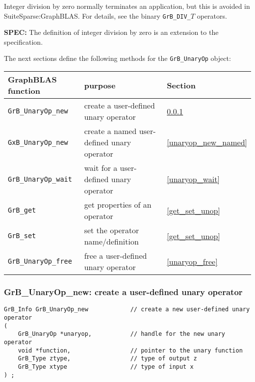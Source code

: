\documentclass[12pt]{article}
\begin{document}
Integer division by zero normally terminates an application, but this is
avoided in SuiteSparse:GraphBLAS.  For details, see the binary
\verb'GrB_DIV_'$T$ operators.

\begin{alert}
{\bf SPEC:} The definition of integer division by zero is an extension to the
specification.
\end{alert}

The next sections define the following methods for the \verb'GrB_UnaryOp'
object:

\vspace{0.1in}
{\footnotesize
\noindent
\begin{tabular}{lll}
\hline
GraphBLAS function   & purpose                                      & Section \\
\hline
\verb'GrB_UnaryOp_new'   & create a user-defined unary operator         & \ref{unaryop_new} \\
\verb'GxB_UnaryOp_new'   & create a named user-defined unary operator   & \ref{unaryop_new_named} \\
\verb'GrB_UnaryOp_wait'  & wait for a user-defined unary operator       & \ref{unaryop_wait} \\
\verb'GrB_get'           & get properties of an operator    & \ref{get_set_unop} \\
\verb'GrB_set'           & set the operator name/definition & \ref{get_set_unop} \\
\verb'GrB_UnaryOp_free'  & free a user-defined unary operator   & \ref{unaryop_free} \\
\hline
\end{tabular}
}
\vspace{0.1in}

\subsubsection{{\sf GrB\_UnaryOp\_new:} create a user-defined unary operator}
\label{unaryop_new}

\begin{mdframed}[userdefinedwidth=6in]
{\footnotesize
\begin{verbatim}
GrB_Info GrB_UnaryOp_new            // create a new user-defined unary operator
(
    GrB_UnaryOp *unaryop,           // handle for the new unary operator
    void *function,                 // pointer to the unary function
    GrB_Type ztype,                 // type of output z
    GrB_Type xtype                  // type of input x
) ;
\end{verbatim} }\end{mdframed}
\end{document}
